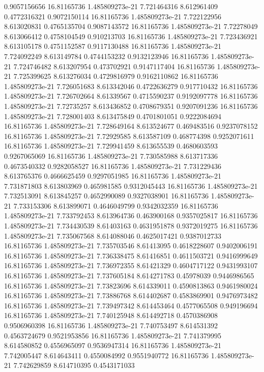 {0.9057156656 16.81165736 1.485809273e-21 7.721464316 8.612961409 0.4772316321
0.9072150114 16.81165736 1.485809273e-21 7.722122956 8.613020831 0.4765135704
0.9087143572 16.81165736 1.485809273e-21 7.72278049 8.613066412 0.4758104549
0.910213703 16.81165736 1.485809273e-21 7.723436921 8.613105178 0.4751152587
0.9117130488 16.81165736 1.485809273e-21 7.724092249 8.613149784 0.4744153232
0.9132123946 16.81165736 1.485809273e-21 7.724746482 8.613207954 0.473702921
0.9147117404 16.81165736 1.485809273e-21 7.725399625 8.613276034 0.4729816979
0.9162110862 16.81165736 1.485809273e-21 7.726051683 8.613342046 0.4722636279
0.917710432 16.81165736 1.485809273e-21 7.726702664 8.61339567 0.4715590237
0.9192097778 16.81165736 1.485809273e-21 7.72735257 8.613436852 0.4708679351
0.9207091236 16.81165736 1.485809273e-21 7.728001403 8.613475849 0.4701801051
0.9222084694 16.81165736 1.485809273e-21 7.728649164 8.613524677 0.469483516
0.9237078152 16.81165736 1.485809273e-21 7.72929585 8.613587109 0.468774398
0.9252071611 16.81165736 1.485809273e-21 7.729941459 8.613655539 0.4680603593
0.9267065069 16.81165736 1.485809273e-21 7.730585988 8.613717336 0.4673540332
0.9282058527 16.81165736 1.485809273e-21 7.731229436 8.613765376 0.4666625459
0.9297051985 16.81165736 1.485809273e-21 7.731871803 8.613803969 0.465981585
0.9312045443 16.81165736 1.485809273e-21 7.732513091 8.613845257 0.4652990089
0.9327038901 16.81165736 1.485809273e-21 7.733153306 8.613899071 0.4646049799
0.9342032359 16.81165736 1.485809273e-21 7.733792453 8.613964736 0.463900168
0.9357025817 16.81165736 1.485809273e-21 7.734430539 8.61403163 0.4631951878
0.9372019275 16.81165736 1.485809273e-21 7.735067568 8.614088046 0.4625017421
0.9387012733 16.81165736 1.485809273e-21 7.735703546 8.61413095 0.4618228607
0.9402006191 16.81165736 1.485809273e-21 7.736338475 8.61416851 0.4611503721
0.9416999649 16.81165736 1.485809273e-21 7.736972355 8.61421329 0.4604717122
0.9431993107 16.81165736 1.485809273e-21 7.737605184 8.614271783 0.45978039
0.9446986565 16.81165736 1.485809273e-21 7.73823696 8.614339011 0.4590813863
0.9461980024 16.81165736 1.485809273e-21 7.73886768 8.614402687 0.4583869901
0.9476973482 16.81165736 1.485809273e-21 7.739497342 8.614453464 0.4577065508
0.949196694 16.81165736 1.485809273e-21 7.740125948 8.614492718 0.4570386908
0.9506960398 16.81165736 1.485809273e-21 7.740753497 8.614531392 0.4563724679
0.9521953856 16.81165736 1.485809273e-21 7.741379995 8.614580852 0.4556965097
0.9536947314 16.81165736 1.485809273e-21 7.742005447 8.614643411 0.4550084992
0.9551940772 16.81165736 1.485809273e-21 7.742629859 8.614710395 0.4543171033
}
